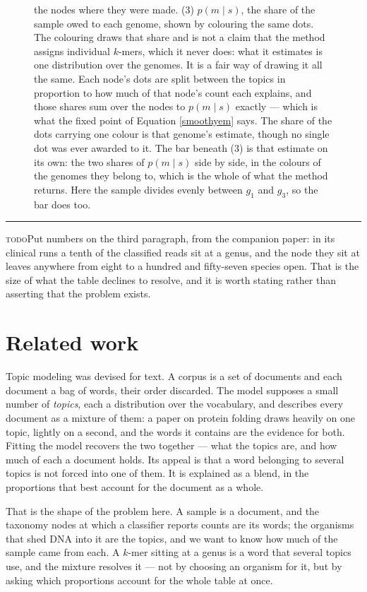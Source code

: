 \documentclass[pdflatex,sn-vancouver-num]{sn-jnl}
\newif\ifshowtodos \showtodostrue
\newcommand{\todo}[1]{%
  \ifshowtodos
    \par\addvspace{0.7\baselineskip}%
    \begin{list}{}{%
      \setlength{\leftmargin}{1.5em}%
      \setlength{\rightmargin}{1.5em}%
      \setlength{\topsep}{0pt}%
      \setlength{\partopsep}{0pt}%
      \setlength{\parsep}{0.5\baselineskip}%
      \setlength{\itemsep}{0pt}%
    }%
    \item[]\footnotesize\color{black!70}%
      \textcolor{orange!65!black}{\rule[-0.2ex]{2pt}{1.15ex}}\hspace{0.55em}%
      \textcolor{orange!65!black}{\textsc{todo}}\hspace{0.6em}\ignorespaces#1%
    \end{list}%
    \addvspace{0.7\baselineskip}%
  \fi%
}
\begin{document}
\begin{figure}[!htbp]
{        the nodes where they were made. (3) $p(m \mid s)$, the share of the sample owed to each
        genome, shown by colouring the same dots. The colouring draws that share and is not a claim
        that the method assigns individual $k$-mers, which it never does: what it estimates is one
        distribution over the genomes. It is a fair way of drawing it all the same. Each node's dots
        are split between the topics in proportion to how much of that node's count each explains,
        and those shares sum over the nodes to $p(m \mid s)$ exactly --- which is what the fixed
        point of Equation \eqref{smoothyem} says. The share of the dots carrying one colour is that
        genome's estimate, though no single dot was ever awarded to it. The bar beneath (3) is that
        estimate on its own: the two shares of $p(m \mid s)$ side by side, in the colours of the
        genomes they belong to, which is the whole of what the method returns. Here the sample
        divides evenly between $g_1$ and $g_3$, so the bar does too.}\label{pngfig}
    \end{figure}

    \todo{Put numbers on the third paragraph, from the companion paper: in its clinical runs a tenth
    of the classified reads sit at a genus, and the node they sit at leaves anywhere from eight to a
    hundred and fifty-seven species open. That is the size of what the table declines to resolve, and
    it is worth stating rather than asserting that the problem exists.}

    \section{Related work}\label{relatedwork}
    Topic modeling was devised for text. A corpus is a set of documents and each document a bag of
    words, their order discarded. The model supposes a small number of \emph{topics}, each a
    distribution over the vocabulary, and describes every document as a mixture of them: a paper on
    protein folding draws heavily on one topic, lightly on a second, and the words it contains are
    the evidence for both. Fitting the model recovers the two together --- what the topics are, and
    how much of each a document holds. Its appeal is that a word belonging to several topics is not
    forced into one of them. It is explained as a blend, in the proportions that best account for the
    document as a whole.

    That is the shape of the problem here. A sample is a document, and the taxonomy nodes at which a
    classifier reports counts are its words; the organisms that shed DNA into it are the topics, and
    we want to know how much of the sample came from each. A $k$-mer sitting at a genus is a word
    that several topics use, and the mixture resolves it --- not by choosing an organism for it,
    but by asking which proportions account for the whole table at once.
\end{document}
